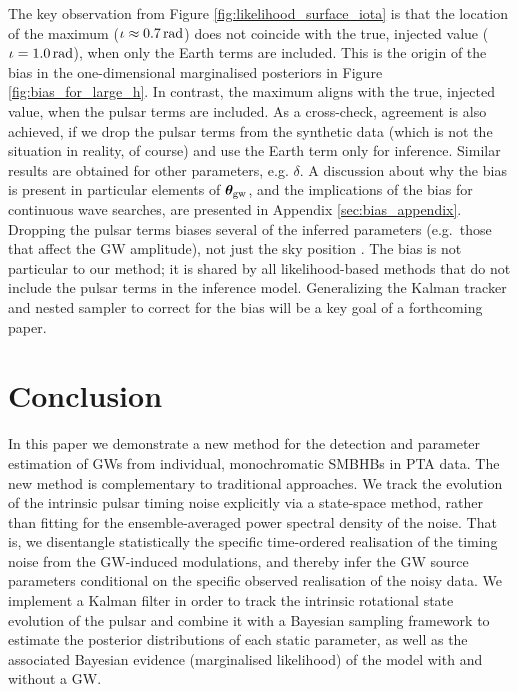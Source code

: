 \documentclass[fleqn,usenatbib,useAMS]{mnras}
\begin{document}
The key observation from Figure \ref{fig:likelihood_surface_iota} is that the location of the maximum ($\iota \approx 0.7 \, {\rm rad}$) does not coincide with the true, injected value ($\iota = 1.0 \, {\rm rad}$), when only the Earth terms are included. This is the origin of the bias in the one-dimensional marginalised posteriors in Figure \ref{fig:bias_for_large_h}. In contrast, the maximum aligns with the true, injected value, when the pulsar terms are included. As a cross-check, agreement is also achieved, if we drop the pulsar terms from the synthetic data (which is not the situation in reality, of course) and use the Earth term only for inference. Similar results are obtained for other parameters, e.g. $\delta$. A discussion about why the bias is present in particular elements of $\boldsymbol{\theta}_{\rm gw}$, and the implications of the bias for continuous wave searches, are presented in Appendix \ref{sec:bias_appendix}. Dropping the pulsar terms biases several of the inferred parameters (e.g.\ those that affect the GW amplitude), not just the sky position  \citep[e.g.][]{Zhupulsarterms,Chen2022}. The bias is not particular to our method; it is shared by all likelihood-based methods that do not include the pulsar terms in the inference model. Generalizing the Kalman tracker and nested sampler to correct for the bias will be a key goal of a forthcoming paper. 


\section{Conclusion}\label{sec:discussion}

In this paper we demonstrate a new method for the detection and parameter estimation of GWs from individual, monochromatic SMBHBs in PTA data. The new method is complementary to traditional approaches. We track the evolution of the intrinsic pulsar timing noise explicitly via a state-space method, rather than fitting for the ensemble-averaged power spectral density of the noise. That is, we disentangle statistically the specific time-ordered realisation of the timing noise from the GW-induced modulations, and thereby infer the GW source parameters conditional on the specific observed realisation of the noisy data. We implement a Kalman filter in order to track the intrinsic rotational state evolution of the pulsar and combine it with a Bayesian sampling framework to estimate the posterior distributions of each static parameter, as well as the associated Bayesian evidence (marginalised likelihood) of the model with and without a GW. \newline 
 
\end{document}
